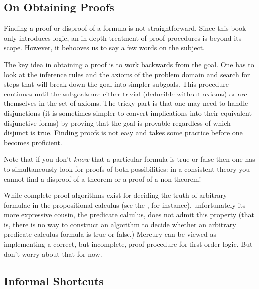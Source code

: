\subsection{On Obtaining Proofs}

Finding a proof or disproof of a formula is not straightforward.  Since
this book only introduces logic, an in-depth treatment of proof
procedures is beyond its scope.  However, it behooves us to say a few
words on the subject.

The key idea in obtaining a proof is to work backwards from the goal.
One has to look at the inference rules and the axioms of the problem
domain and search for steps that will break down the goal into simpler
subgoals.  This procedure continues until the subgoals are either
trivial (deducible without axioms) or are themselves in the set of
axioms.  The tricky part is that one may need to handle disjunctions (it
is sometimes simpler to convert implications into their equivalent
disjunctive forms) by proving that the goal is provable regardless of
which disjunct is true.  Finding proofs is not easy and takes some
practice before one becomes proficient.

Note that if you don't \emph{know} that a particular formula is true or
false then one has to simultaneously look for proofs of both
possibilities: in a consistent theory you cannot find a disproof of a
theorem or a proof of a non-theorem!

While complete proof algorithms exist for deciding the truth of
arbitrary formulae in the propositional calculus (see the
, for instance), unfortunately its more
expressive cousin, the predicate calculus, does not admit this property
(that is, there is no way to construct an algorithm to decide whether an
arbitrary predicate calculus formula is true or false.)  Mercury can be
viewed as implementing a correct, but incomplete, proof procedure for
first order logic.  But don't worry about that for now.

\subsection{Informal Shortcuts}

